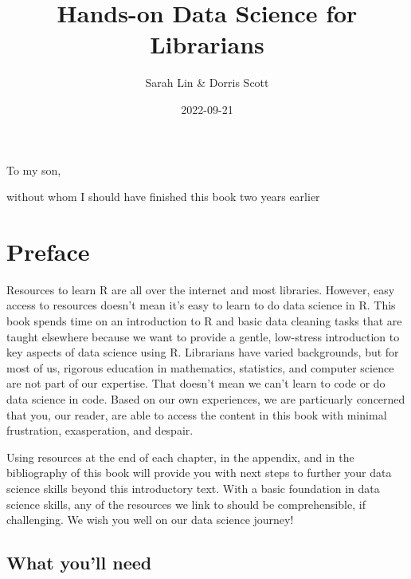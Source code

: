 \documentclass[
  krantz2]{krantz}
\title{Hands-on Data Science for Librarians}
\author{Sarah Lin \& Dorris Scott}
\date{2022-09-21}
\begin{document}
\maketitle


\thispagestyle{empty}

\begin{center}
To my son,

without whom I should have finished this book two years earlier
\end{center}

\setlength{\abovedisplayskip}{-5pt}
\setlength{\abovedisplayshortskip}{-5pt}

{
\hypersetup{linkcolor=}
\setcounter{tocdepth}{2}
\tableofcontents
}
\listoffigures
\hypertarget{preface}{%
\chapter*{Preface}\label{preface}}


Resources to learn R are all over the internet and most libraries. However, easy access to resources doesn't mean it's easy to learn to do data science in R. This book spends time on an introduction to R and basic data cleaning tasks that are taught elsewhere because we want to provide a gentle, low-stress introduction to key aspects of data science using R. Librarians have varied backgrounds, but for most of us, rigorous education in mathematics, statistics, and computer science are not part of our expertise. That doesn't mean we can't learn to code or do data science in code. Based on our own experiences, we are particuarly concerned that you, our reader, are able to access the content in this book with minimal frustration, exasperation, and despair.

Using resources at the end of each chapter, in the appendix, and in the bibliography of this book will provide you with next steps to further your data science skills beyond this introductory text. With a basic foundation in data science skills, any of the resources we link to should be comprehensible, if challenging. We wish you well on our data science journey!

\hypertarget{what-youll-need}{%
\section*{What you'll need}\label{what-youll-need}}
\end{document}
